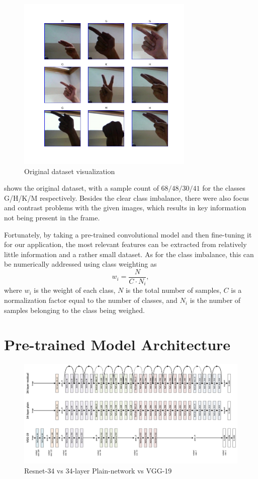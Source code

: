 \documentclass{scrartcl}
\begin{document}
  \begin{figure}[ht]
    \centering
    \includegraphics[width=0.75\textwidth]{../figures/rgb_overview.png}
    \caption{Original dataset visualization}
    \label{fig:rgb_overview}
  \end{figure}

   shows the original dataset, with a sample count of $68/48/30/41$ for the classes G/H/K/M respectively. Besides the clear class imbalance, there were also focus and contrast problems with the given images, which results in key information not being present in the frame.
  
  Fortunately, by taking a pre-trained convolutional model and then fine-tuning it for our application, the most relevant features can be extracted from relatively little information and a rather small dataset. As for the class imbalance, this can be numerically addressed using class weighting as $$w_i = \frac{N}{C \cdot N_i} ,$$ where $w_i$ is the weight of each class, $N$ is the total number of samples, $C$ is a normalization factor equal to the number of classes, and $N_i$ is the number of samples belonging to the class being weighed.

\section{Pre-trained Model Architecture}

  \begin{figure}[ht]
    \centering
    \includegraphics[width=\textwidth]{../figures/base_model.png}
    \caption{Resnet-34 vs 34-layer Plain-network vs VGG-19}
    \label{fig:base_model}
  \end{figure}
\end{document}
